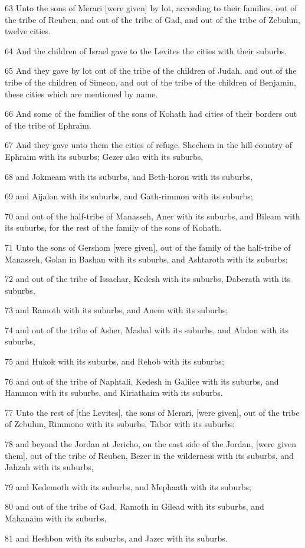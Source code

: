 \par 63 Unto the sons of Merari [were given] by lot, according to their families, out of the tribe of Reuben, and out of the tribe of Gad, and out of the tribe of Zebulun, twelve cities.
\par 64 And the children of Israel gave to the Levites the cities with their suburbs.
\par 65 And they gave by lot out of the tribe of the children of Judah, and out of the tribe of the children of Simeon, and out of the tribe of the children of Benjamin, these cities which are mentioned by name.
\par 66 And some of the families of the sons of Kohath had cities of their borders out of the tribe of Ephraim.
\par 67 And they gave unto them the cities of refuge, Shechem in the hill-country of Ephraim with its suburbs; Gezer also with its suburbs,
\par 68 and Jokmeam with its suburbs, and Beth-horon with its suburbs,
\par 69 and Aijalon with its suburbs, and Gath-rimmon with its suburbs;
\par 70 and out of the half-tribe of Manasseh, Aner with its suburbs, and Bileam with its suburbs, for the rest of the family of the sons of Kohath.
\par 71 Unto the sons of Gershom [were given], out of the family of the half-tribe of Manasseh, Golan in Bashan with its suburbs, and Ashtaroth with its suburbs;
\par 72 and out of the tribe of Issachar, Kedesh with its suburbs, Daberath with its suburbs,
\par 73 and Ramoth with its suburbs, and Anem with its suburbs;
\par 74 and out of the tribe of Asher, Mashal with its suburbs, and Abdon with its suburbs,
\par 75 and Hukok with its suburbs, and Rehob with its suburbs;
\par 76 and out of the tribe of Naphtali, Kedesh in Galilee with its suburbs, and Hammon with its suburbs, and Kiriathaim with its suburbs.
\par 77 Unto the rest of [the Levites], the sons of Merari, [were given], out of the tribe of Zebulun, Rimmono with its suburbs, Tabor with its suburbs;
\par 78 and beyond the Jordan at Jericho, on the east side of the Jordan, [were given them], out of the tribe of Reuben, Bezer in the wilderness with its suburbs, and Jahzah with its suburbs,
\par 79 and Kedemoth with its suburbs, and Mephaath with its suburbs;
\par 80 and out of the tribe of Gad, Ramoth in Gilead with its suburbs, and Mahanaim with its suburbs,
\par 81 and Heshbon with its suburbs, and Jazer with its suburbs.

